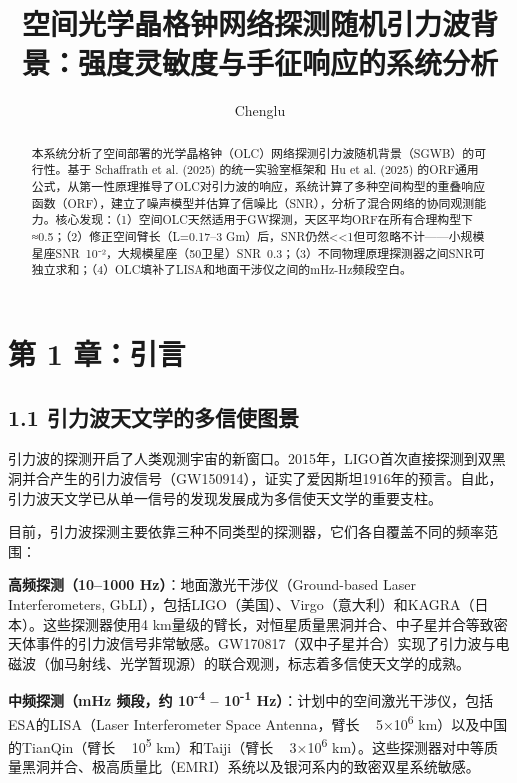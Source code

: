 \documentclass[12pt,a4paper]{article}
\begin{document}
\title{空间光学晶格钟网络探测随机引力波背景：强度灵敏度与手征响应的系统分析}
\author{Chenglu}
\date{}
\maketitle
\begin{abstract}
本系统分析了空间部署的光学晶格钟（OLC）网络探测引力波随机背景（SGWB）的可行性。基于 Schaffrath et al. (2025) 的统一实验室框架和 Hu et al. (2025) 的ORF通用公式，从第一性原理推导了OLC对引力波的响应，系统计算了多种空间构型的重叠响应函数（ORF），建立了噪声模型并估算了信噪比（SNR），分析了混合网络的协同观测能力。核心发现：（1）空间OLC天然适用于GW探测，天区平均ORF在所有合理构型下≈0.5；（2）修正空间臂长（L=0.17–3 Gm）后，SNR仍然<<1但可忽略不计——小规模星座SNR~10⁻²，大规模星座（50卫星）SNR~0.3；（3）不同物理原理探测器之间SNR可独立求和；（4）OLC填补了LISA和地面干涉仪之间的mHz-Hz频段空白。
\end{abstract}

\section{第 1 章：引言}


\subsection{1.1 引力波天文学的多信使图景}


引力波的探测开启了人类观测宇宙的新窗口。2015年，LIGO首次直接探测到双黑洞并合产生的引力波信号（GW150914）\cite{ref1}，证实了爱因斯坦1916年的预言。自此，引力波天文学已从单一信号的发现发展成为多信使天文学的重要支柱。

目前，引力波探测主要依靠三种不同类型的探测器，它们各自覆盖不同的频率范围：

\textbf{高频探测（10–1000 Hz）}：地面激光干涉仪（Ground-based Laser Interferometers, GbLI），包括LIGO（美国）、Virgo（意大利）和KAGRA（日本）。这些探测器使用4 km量级的臂长，对恒星质量黑洞并合、中子星并合等致密天体事件的引力波信号非常敏感。GW170817（双中子星并合）实现了引力波与电磁波（伽马射线、光学暂现源）的联合观测，标志着多信使天文学的成熟\cite{ref2}。

\textbf{中频探测（mHz 频段，约 10\textsuperscript{-4} – 10\textsuperscript{-1} Hz）}：计划中的空间激光干涉仪，包括ESA的LISA（Laser Interferometer Space Antenna，臂长 ~ 5×10\textsuperscript{6} km）以及中国的TianQin（臂长 ~ 10\textsuperscript{5} km）和Taiji（臂长 ~ 3×10\textsuperscript{6} km）\cite{ref3}。这些探测器对中等质量黑洞并合、极高质量比（EMRI）系统以及银河系内的致密双星系统敏感。
\end{document}
